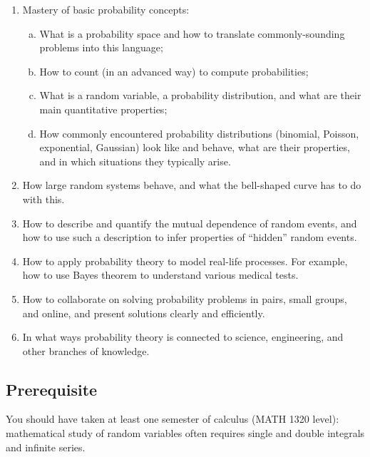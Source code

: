 \documentclass[oneside,11pt]{amsart}
\begin{document}
\begin{enumerate}[\bf{}1.]
	\item Mastery of basic probability concepts:
	\begin{enumerate}[(a)]
		\item What is a probability space and how to translate commonly-sounding problems into this language;
		\item How to count (in an advanced way) to compute probabilities;
		\item What is a random variable, a probability distribution,
		and what are their main quantitative properties;
		\item 
		How commonly encountered probability 
		distributions (binomial, Poisson, exponential, Gaussian) look like and behave,
		what are 
		their properties, and in which situations they typically arise.
	\end{enumerate}

	\item How large random systems behave, and what the 
	bell-shaped curve
	has to do with this.
	\item How to describe and quantify the mutual dependence of random events,
	and how to use such a description 
	to infer properties of ``hidden'' random events.
	\item How to apply probability theory to model real-life processes. For example,
		how to use Bayes theorem to understand various medical tests.
	\item How to collaborate on solving probability problems in pairs, small groups, and online,
	and present solutions clearly and efficiently.
	\item In what ways probability theory is connected to science,
	engineering, and other branches of knowledge.
\end{enumerate}

\subsection*{Prerequisite} You should have taken at least one semester of calculus (MATH 1320 level):
mathematical study of random variables often requires single and double integrals
and infinite series.
\end{document}
